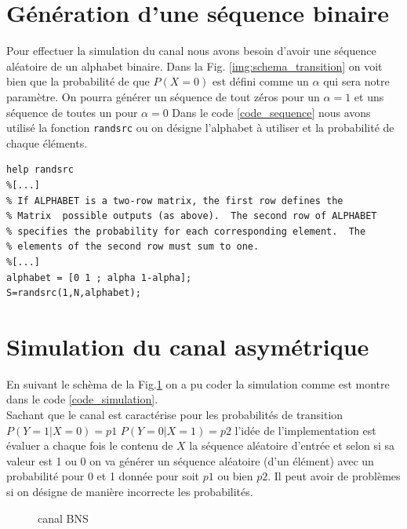 \documentclass{report}
\begin{document}
\section{Génération d'une séquence binaire}
Pour effectuer la simulation du canal nous avons besoin d'avoir une séquence aléatoire de un alphabet binaire.
Dans la Fig. \ref{img:schema_transition} on voit bien que la probabilité de que $P(X=0)$ est défini comme un 
$\alpha$ qui sera notre paramètre. On pourra générer un séquence de tout zéros pour un $\alpha = 1$ et uns séquence de toutes un pour $\alpha = 0$
Dans le code \ref{code_sequence} nous avons utilisé la fonction \texttt{randsrc} ou on désigne 
l'alphabet à utiliser et la probabilité de chaque éléments.

\begin{lstlisting}[caption={Code générateur de séquence bynaire aléatoire},label=code_sequence]
help randsrc
%[...] 
% If ALPHABET is a two-row matrix, the first row defines the
% Matrix  possible outputs (as above).  The second row of ALPHABET
% specifies the probability for each corresponding element.  The
% elements of the second row must sum to one.
%[...] 
alphabet = [0 1 ; alpha 1-alpha];
S=randsrc(1,N,alphabet);
\end{lstlisting}

\section{Simulation du canal asymétrique}
En suivant le schèma de la Fig.\ref{img:schema_transition_2} on a pu coder la simulation comme est 
montre dans le code \ref{code_simulation}.\\
Sachant que le canal est caractérise pour les probabilités de transition $P(Y = 1|X = 0)=p1$ $ P(Y = 0|X = 1)=p2 $ l'idée de l'implementation est évaluer a chaque fois le contenu de $X$ la séquence aléatoire d'entrée et selon si sa 
valeur est 1 ou 0 on va générer un séquence aléatoire (d'un élément) avec un probabilité pour 0 et 1 donnée pour soit $p1$ ou bien $p2$. Il peut avoir de problèmes si on désigne de manière
incorrecte les probabilités.

\begin{figure}[h]
	\centering
	\caption{canal BNS}
	\label{img:schema_transition_2}
\end{figure}
\end{document}
